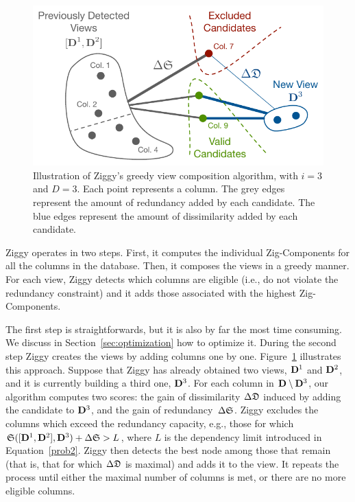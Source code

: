 \begin{figure}
  \centering
  \includegraphics[width=\columnwidth]{Figures/Greedy}
  \caption{Illustration of Ziggy's greedy view composition algorithm, with
      $i=3$
  and $D=3$. Each point represents a column. The grey edges represent the
  amount of redundancy added by each candidate. The blue edges represent the
  amount of dissimilarity added by each candidate.}
  \label{pic:greedy}
\end{figure}
Ziggy operates in two steps. First, it computes the individual Zig-Components
for all the columns in the database. Then, it composes the views in a  greedy
manner. For each view, Ziggy detects which columns are eligible (i.e., do not
violate the redundancy constraint) and it adds those associated with the highest
Zig-Components.

The first step is straightforwards, but it is also by far the most time
consuming. We discuss in Section~\ref{sec:optimization} how to optimize it.
During the second step Ziggy creates the views by adding columns one by one.
Figure~\ref{pic:greedy} illustrates this approach. Suppose that Ziggy has
already obtained two views, $\mathbf{D}^1$ and $\mathbf{D}^2$, and it is currently
building a third one, $\mathbf{D}^3$. For each column in $\mathbf{D} \setminus \mathbf{D}^3
$, our algorithm computes two scores: the gain of dissimilarity $\Delta\mathfrak{D}$
induced by adding the candidate to $\mathbf{D}^3$, and the gain of
redundancy~$\Delta\mathfrak{S}$. Ziggy excludes the columns which exceed the
redundancy capacity, e.g., those for which $\mathfrak{S}([\mathbf{D}^1, \mathbf{D}^2],
\mathbf{D}^3) + \Delta\mathfrak{S} > L$, where $L$ is the dependency limit introduced in
Equation~\ref{prob2}. Ziggy then detects the best node among those that
remain (that is, that for which $\Delta\mathfrak{D}$ is maximal) and adds it to the
view. It repeats the process until either the maximal number of columns is met, or
there are no more eligible columns.

